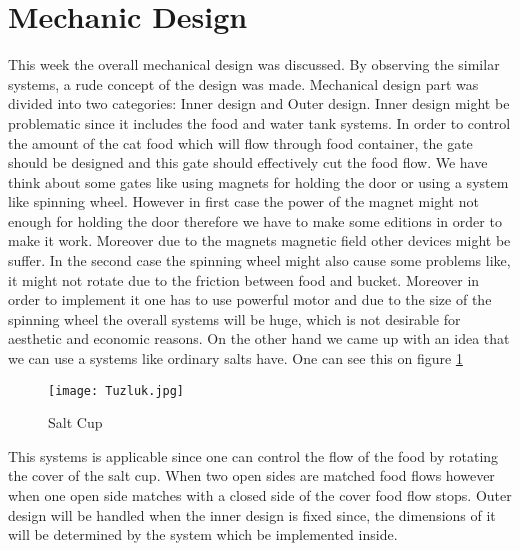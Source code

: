 \section{Mechanic Design} \label{sec:mechanic}
This week the overall mechanical design was discussed. By observing the similar systems, a rude concept of the design was made.  Mechanical design part was divided into two categories: Inner design and Outer design.
Inner design might be problematic since it includes the food and water tank systems. In order to control the amount of the cat food which will flow through food container, the gate should be designed and this gate should effectively cut the food flow. We have think about some gates like using magnets for holding the door or using a system like spinning wheel. However in first case the power of the magnet might not enough for holding the door therefore we have to make some editions in order to make it work. Moreover due to the magnets magnetic field other devices might be suffer. In the second case the spinning wheel might also cause some problems like, it might not rotate due to the friction between food and bucket. Moreover in order to implement it one has to use powerful motor and due to the size of the spinning wheel the overall systems will be huge, which is not desirable for aesthetic and economic reasons. On the other hand we came up with an idea that we can use a systems like ordinary salts have. One can see this on figure \ref{fig:tuzluk}

\begin{figure}
    \centering
    \texttt{[image: Tuzluk.jpg]}
    \caption{Salt Cup}
    \label{fig:tuzluk}
\end{figure}

This systems is applicable since one can control the flow of the food by rotating the cover of the salt cup. When two open sides are matched food flows however when one open side matches with a closed side of the cover food flow stops.
Outer design will be handled when the inner design is fixed since, the dimensions of it will be determined by the system which be implemented inside.

